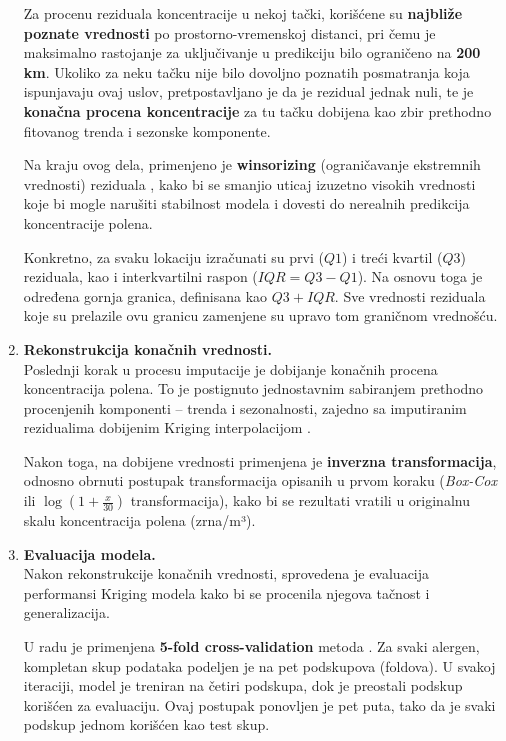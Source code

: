 \documentclass[12pt]{article}
\begin{document}
\begin{enumerate}
    Za procenu reziduala koncentracije u nekoj tački, korišćene su \textbf{najbliže poznate vrednosti} po prostorno-vremenskoj distanci, pri čemu je maksimalno rastojanje za uključivanje u predikciju bilo ograničeno na \textbf{200 km}. Ukoliko za neku tačku nije bilo dovoljno poznatih posmatranja koja ispunjavaju ovaj uslov, pretpostavljano je da je rezidual jednak nuli, te je \textbf{konačna procena koncentracije} za tu tačku dobijena kao zbir prethodno fitovanog trenda i sezonske komponente.

    Na kraju ovog dela, primenjeno je \textbf{winsorizing} (ograničavanje ekstremnih vrednosti) reziduala \cite{jones1996winsorizing}, kako bi se smanjio uticaj izuzetno visokih vrednosti koje bi mogle narušiti stabilnost modela i dovesti do nerealnih predikcija koncentracije polena.
    
    Konkretno, za svaku lokaciju izračunati su prvi ($Q1$) i treći kvartil ($Q3$) reziduala, kao i interkvartilni raspon ($IQR = Q3 - Q1$). Na osnovu toga je određena gornja granica, definisana kao $Q3 + IQR$. Sve vrednosti reziduala koje su prelazile ovu granicu zamenjene su upravo tom graničnom vrednošću.

    \item \textbf{Rekonstrukcija konačnih vrednosti.} \\

    Poslednji korak u procesu imputacije je dobijanje konačnih procena koncentracija polena. To je postignuto jednostavnim sabiranjem prethodno procenjenih komponenti – trenda i sezonalnosti, zajedno sa imputiranim rezidualima dobijenim Kriging interpolacijom \cite{cressie1993statistics}.

    Nakon toga, na dobijene vrednosti primenjena je \textbf{inverzna transformacija}, odnosno obrnuti postupak transformacija opisanih u prvom koraku (\textit{Box-Cox} ili $\log(1 + \frac{x}{30})$ transformacija), kako bi se rezultati vratili u originalnu skalu koncentracija polena (zrna/m³).

    \item \textbf{Evaluacija modela.} \\

    Nakon rekonstrukcije konačnih vrednosti, sprovedena je evaluacija performansi Kriging modela kako bi se procenila njegova tačnost i generalizacija. 

    U radu je primenjena \textbf{5-fold cross-validation} metoda \cite{hyndman2018forecasting}. Za svaki alergen, kompletan skup podataka podeljen je na pet podskupova (foldova). U svakoj iteraciji, model je treniran na četiri podskupa, dok je preostali podskup korišćen za evaluaciju. Ovaj postupak ponovljen je pet puta, tako da je svaki podskup jednom korišćen kao test skup. 

\end{enumerate}
\end{document}
